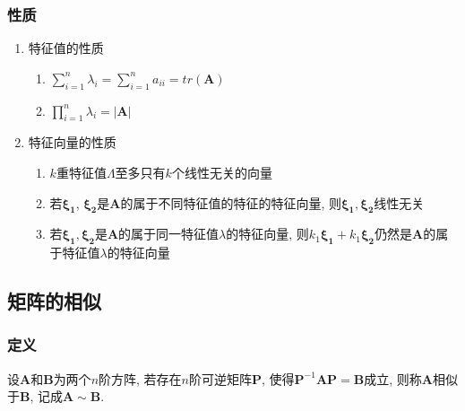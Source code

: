\subsubsection{性质}
\begin{enumerate}
\item 特征值的性质
\begin{enumerate}
\item $ \sum_{i=1}^{n}\lambda_{i}=\sum_{i=1}^{n}a_{ii}=tr(\bm{A}) $
\item $ \prod_{i=1}^{n}\lambda_{i}=\left| \bm{A}\right| $
\end{enumerate}
\item 特征向量的性质
\begin{enumerate}
\item $ k $重特征值$ \Lambda $至多只有$ k $个线性无关的向量
\item 若$ \bm{\xi_1} $, $ \bm{\xi_2} $是$ \bm{A} $的属于不同特征值的特征的特征向量, 则$ \bm{\xi_1}, \bm{\xi_2} $线性无关
\item 若$ \bm{\xi_1}, \bm{\xi_2} $是$ \bm{A} $的属于同一特征值$ \lambda $的特征向量, 则$ k_1\bm{\xi_1} + k_1\bm{\xi_2} $仍然是$ \bm{A} $的属于特征值$ \lambda $的特征向量
\end{enumerate}
\end{enumerate}
\subsection{矩阵的相似}
\subsubsection{定义}
设$ \bm{A} $和$ \bm{B} $为两个$ n $阶方阵, 若存在$ n $阶可逆矩阵$ \bm{P} $, 使得$ \bm{P}^{-1}\bm{A}\bm{P}=\bm{B} $成立, 则称$ \bm{A} $相似于$ \bm{B} $, 记成$ \bm{A}\sim \bm{B} $.
